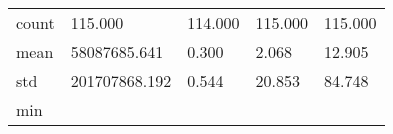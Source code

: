 \documentclass[
  10pt,
  a4paper,
,tablecaptionabove
]{scrartcl}
\begin{document}
\begin{longtable}[]{@{}lllll@{}}
\begin{minipage}[t]{0.11\columnwidth}\raggedright
count\strut
\end{minipage} & \begin{minipage}[t]{0.20\columnwidth}\raggedright
115.000\strut
\end{minipage} & \begin{minipage}[t]{0.13\columnwidth}\raggedright
114.000\strut
\end{minipage} & \begin{minipage}[t]{0.15\columnwidth}\raggedright
115.000\strut
\end{minipage} & \begin{minipage}[t]{0.15\columnwidth}\raggedright
115.000\strut
\end{minipage}\tabularnewline
\begin{minipage}[t]{0.11\columnwidth}\raggedright
mean\strut
\end{minipage} & \begin{minipage}[t]{0.20\columnwidth}\raggedright
58087685.641\strut
\end{minipage} & \begin{minipage}[t]{0.13\columnwidth}\raggedright
0.300\strut
\end{minipage} & \begin{minipage}[t]{0.15\columnwidth}\raggedright
2.068\strut
\end{minipage} & \begin{minipage}[t]{0.15\columnwidth}\raggedright
12.905\strut
\end{minipage}\tabularnewline
\begin{minipage}[t]{0.11\columnwidth}\raggedright
std\strut
\end{minipage} & \begin{minipage}[t]{0.20\columnwidth}\raggedright
201707868.192\strut
\end{minipage} & \begin{minipage}[t]{0.13\columnwidth}\raggedright
0.544\strut
\end{minipage} & \begin{minipage}[t]{0.15\columnwidth}\raggedright
20.853\strut
\end{minipage} & \begin{minipage}[t]{0.15\columnwidth}\raggedright
84.748\strut
\end{minipage}\tabularnewline
\begin{minipage}[t]{0.11\columnwidth}\raggedright
min\strut
\end{minipage} & \begin{minipage}[t]{0.20\columnwidth}\raggedright

\end{minipage}
\end{longtable}
\end{document}
